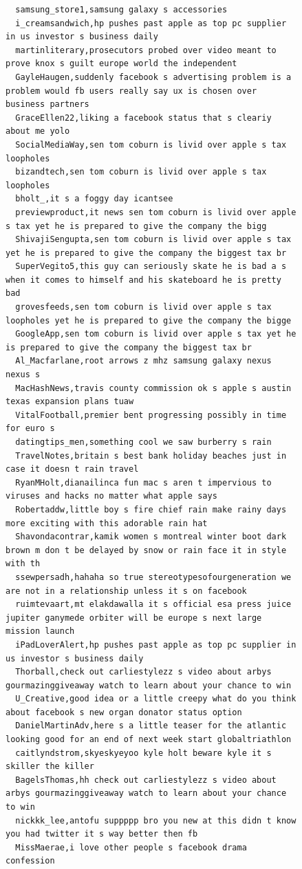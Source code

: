 \begin{figure}[htpb]
\begin{verbatim}
  samsung_store1,samsung galaxy s accessories
  i_creamsandwich,hp pushes past apple as top pc supplier in us investor s business daily
  martinliterary,prosecutors probed over video meant to prove knox s guilt europe world the independent
  GayleHaugen,suddenly facebook s advertising problem is a problem would fb users really say ux is chosen over business partners
  GraceEllen22,liking a facebook status that s cleariy about me yolo
  SocialMediaWay,sen tom coburn is livid over apple s tax loopholes
  bizandtech,sen tom coburn is livid over apple s tax loopholes
  bholt_,it s a foggy day icantsee
  previewproduct,it news sen tom coburn is livid over apple s tax yet he is prepared to give the company the bigg
  ShivajiSengupta,sen tom coburn is livid over apple s tax yet he is prepared to give the company the biggest tax br
  SuperVegito5,this guy can seriously skate he is bad a s when it comes to himself and his skateboard he is pretty bad
  grovesfeeds,sen tom coburn is livid over apple s tax loopholes yet he is prepared to give the company the bigge
  GoogleApp,sen tom coburn is livid over apple s tax yet he is prepared to give the company the biggest tax br
  Al_Macfarlane,root arrows z mhz samsung galaxy nexus nexus s
  MacHashNews,travis county commission ok s apple s austin texas expansion plans tuaw
  VitalFootball,premier bent progressing possibly in time for euro s
  datingtips_men,something cool we saw burberry s rain
  TravelNotes,britain s best bank holiday beaches just in case it doesn t rain travel
  RyanMHolt,dianailinca fun mac s aren t impervious to viruses and hacks no matter what apple says
  Robertaddw,little boy s fire chief rain make rainy days more exciting with this adorable rain hat
  Shavondacontrar,kamik women s montreal winter boot dark brown m don t be delayed by snow or rain face it in style with th
  ssewpersadh,hahaha so true stereotypesofourgeneration we are not in a relationship unless it s on facebook
  ruimtevaart,mt elakdawalla it s official esa press juice jupiter ganymede orbiter will be europe s next large mission launch
  iPadLoverAlert,hp pushes past apple as top pc supplier in us investor s business daily
  Thorball,check out carliestylezz s video about arbys gourmazinggiveaway watch to learn about your chance to win
  U_Creative,good idea or a little creepy what do you think about facebook s new organ donator status option
  DanielMartinAdv,here s a little teaser for the atlantic looking good for an end of next week start globaltriathlon
  caitlyndstrom,skyeskyeyoo kyle holt beware kyle it s skiller the killer
  BagelsThomas,hh check out carliestylezz s video about arbys gourmazinggiveaway watch to learn about your chance to win
  nickkk_lee,antofu suppppp bro you new at this didn t know you had twitter it s way better then fb
  MissMaerae,i love other people s facebook drama confession


\end{verbatim}
\end{figure}
